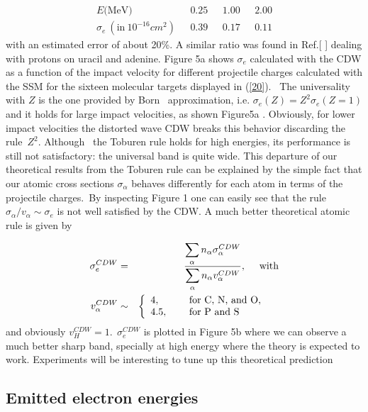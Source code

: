 \documentclass[preprint,showpacs,pra]{revtex4}
\begin{document}
\begin{equation}
\begin{array}{cccc}
E\text{(MeV)} & \ \ \ 0.25 & \ \ \ 1.00 & \ \ \ 2.00 \\ 
\sigma _{e}\ (\text{in}\ 10^{-16}cm^{2}) & \ \ \ 0.39 & \ \ \ 0.17 & \ \ \
0.11%
\end{array}
\label{30}
\end{equation}%
with an estimated error of about 20\%. A similar ratio was found in Ref.[%
\cite{itoh2013}] dealing with protons on uracil and adenine. Figure 5a shows 
$\sigma _{e}$ calculated with the CDW as a function of the impact velocity
for different projectile charges calculated with the SSM for the sixteen
molecular targets displayed in (\ref{20}). \ The universality with $Z$ is
the one provided by Born \ approximation, i.e. $\sigma _{e}(Z)=Z^{2}\sigma
_{e}(Z=1)$ and it holds for large impact velocities, as shown Figure5a .
Obviously, for lower impact velocities the distorted wave CDW breaks this
behavior discarding the rule\ $Z^{2}$. Although \ the Toburen rule holds for
high energies, its performance is still not satisfactory: the universal band
is quite wide. This departure of our theoretical results from the Toburen
rule can be explained by the simple fact that our atomic cross sections $%
\sigma _{\alpha }$ behaves differently for each atom in terms of the
projectile charges.\ By inspecting Figure 1 one can easily see that the rule 
$\sigma _{\alpha }/v_{\alpha }\sim \sigma _{e}$ is not well satisfied by the
CDW. A much better theoretical atomic rule is given by

\begin{eqnarray}
\sigma _{e}^{CDW} &=&\frac{\dsum\limits_{\alpha }n_{\alpha }\sigma _{\alpha
}^{CDW}}{\dsum\limits_{\alpha }n_{\alpha }v_{\alpha }^{CDW}},~\text{\ with}
\label{32} \\
v_{\alpha }^{CDW} &\sim &\left\{ 
\begin{array}{ll}
4,\ \ \  & \text{for C, N, and O,} \\ 
4.5,\ \  & \text{for P and S}%
\end{array}%
\right. \text{ }  \label{35}
\end{eqnarray}%
and obviously $v_{H}^{CDW}=1.\ \ \sigma _{e}^{CDW}$ is plotted in Figure 5b
where we can observe a much better sharp band, specially at high energy
where the theory is expected to work. Experiments will be interesting to
tune up this theoretical prediction

\subsection{Emitted electron energies}
\end{document}
